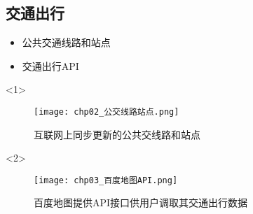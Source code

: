 \subsection{交通出行}

\begin{frame}[t]{\subsecname}
\begin{itemize}
\item<1-> 公共交通线路和站点
\item<2-> 交通出行API
\end{itemize}

\begin{overlayarea}{\textwidth}{\textheight}
  \begin{onlyenv}<1>
\begin{figure}
  \centering
  \texttt{[image: chp02\_公交线路站点.png]}
  \caption{互联网上同步更新的公共交线路和站点}
\end{figure}
  \end{onlyenv}

  \begin{onlyenv}<2>
\begin{figure}
  \centering
  \texttt{[image: chp03\_百度地图API.png]}
  \caption{百度地图提供API接口供用户调取其交通出行数据}
\end{figure}
  \end{onlyenv}
\end{overlayarea}
\end{frame}
